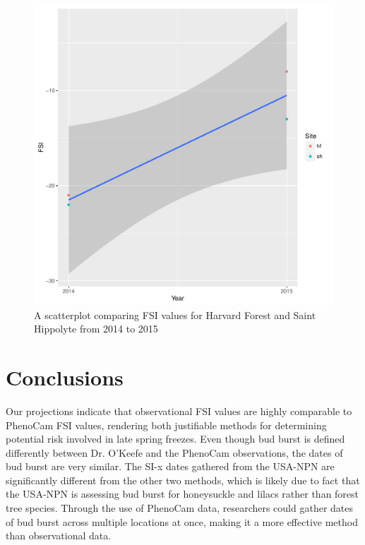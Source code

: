 \documentclass{article}\usepackage[]{graphicx}\usepackage[]{color}
\makeatletter
\def\maxwidth{ %
  \ifdim\Gin@nat@width>\linewidth
    \linewidth
  \else
    \Gin@nat@width
  \fi
}
\makeatother
\begin{document}
\begin{figure}

{\centering \includegraphics[width=\maxwidth]{figure/gradient-1} 

}

\caption[A scatterplot comparing FSI values for Harvard Forest and Saint Hippolyte from 2014 to 2015]{A scatterplot comparing FSI values for Harvard Forest and Saint Hippolyte from 2014 to 2015}\label{fig:gradient}
\end{figure}



\section{Conclusions}
Our projections indicate that observational FSI values are highly comparable to PhenoCam FSI values, rendering both justifiable methods for determining potential risk involved in late spring freezes. Even though bud burst is defined differently between Dr. O'Keefe and the PhenoCam observations, the dates of bud burst are very similar. The SI-x dates gathered from the USA-NPN are significantly different from the other two methods, which is likely due to fact that the USA-NPN is assessing bud burst for honeysuckle and lilacs rather than forest tree species. Through the use of PhenoCam data, researchers could gather dates of bud burst across multiple locations at once, making it a more effective method than observational data. 
\end{document}
